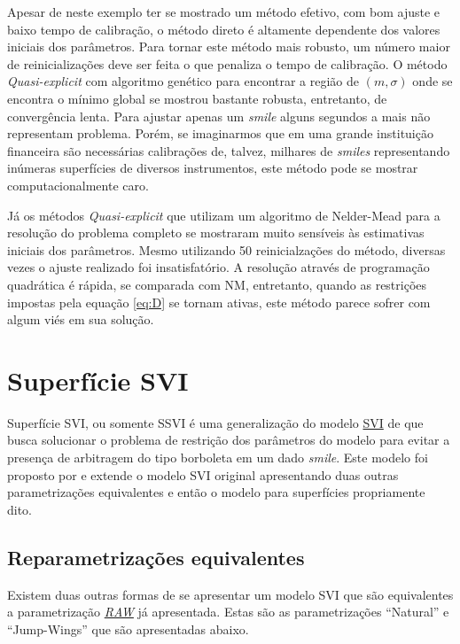 \documentclass[]{book}
\theoremstyle{definition}
\theoremstyle{definition}
\theoremstyle{definition}
\theoremstyle{remark}
\begin{document}
Apesar de neste exemplo ter se mostrado um método efetivo, com bom ajuste e baixo tempo de calibração, o método direto é altamente dependente dos valores iniciais dos parâmetros. Para tornar este método mais robusto, um número maior de reinicializações deve ser feita o que penaliza o tempo de calibração. O método \emph{Quasi-explicit} com algoritmo genético para encontrar a região de \((m, \sigma)\) onde se encontra o mínimo global se mostrou bastante robusta, entretanto, de convergência lenta. Para ajustar apenas um \emph{smile} alguns segundos a mais não representam problema. Porém, se imaginarmos que em uma grande instituição financeira são necessárias calibrações de, talvez, milhares de \emph{smiles} representando inúmeras superfícies de diversos instrumentos, este método pode se mostrar computacionalmente caro.

Já os métodos \emph{Quasi-explicit} que utilizam um algoritmo de Nelder-Mead para a resolução do problema completo se mostraram muito sensíveis às estimativas iniciais dos parâmetros. Mesmo utilizando 50 reinicialzações do método, diversas vezes o ajuste realizado foi insatisfatório. A resolução através de programação quadrática é rápida, se comparada com NM, entretanto, quando as restrições impostas pela equação \eqref{eq:D} se tornam ativas, este método parece sofrer com algum viés em sua solução.

\hypertarget{ssvi}{%
\chapter{Superfície SVI}\label{ssvi}}

Superfície SVI, ou somente SSVI é uma generalização do modelo \protect\hyperlink{svi}{SVI} de \citep{Gatheral2004} que busca solucionar o problema de restrição dos parâmetros do modelo para evitar a presença de arbitragem do tipo borboleta em um dado \emph{smile}. Este modelo foi proposto por \citep{Gatheral2014} e extende o modelo SVI original apresentando duas outras parametrizações equivalentes e então o modelo para superfícies propriamente dito.

\hypertarget{reparametrizacoes-equivalentes}{%
\section{Reparametrizações equivalentes}\label{reparametrizacoes-equivalentes}}

Existem duas outras formas de se apresentar um modelo SVI que são equivalentes a parametrização \protect\hyperlink{superficies}{\emph{RAW}} já apresentada. Estas são as parametrizações ``Natural'' e ``Jump-Wings'' que são apresentadas abaixo.
\end{document}
